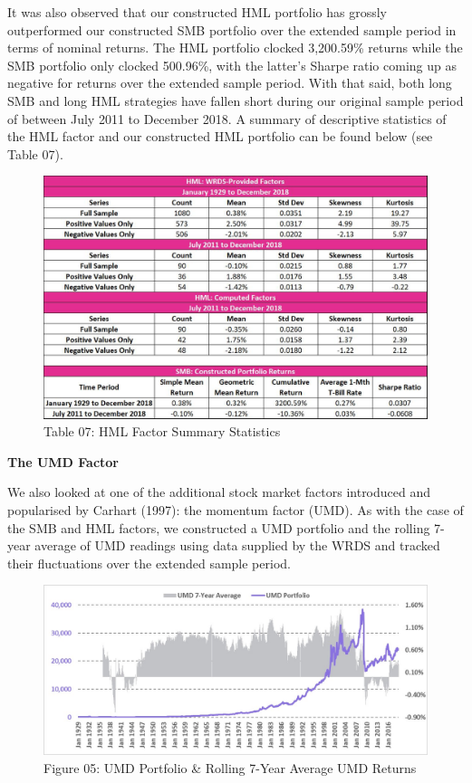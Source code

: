 \documentclass[12pt]{article}
\begin{document}
\noindent It was also observed that our constructed HML portfolio has grossly outperformed our constructed SMB portfolio over the extended sample period in terms of nominal returns. The HML portfolio clocked 3,200.59\% returns while the SMB portfolio only clocked 500.96\%, with the latter's Sharpe ratio coming up as negative for returns over the extended sample period. With that said, both long SMB and long HML strategies have fallen short during our original sample period of between July 2011 to December 2018. A summary of descriptive statistics of the HML factor and our constructed HML portfolio can be found below (see Table 07).

\begin{figure}[h]
	\centering
	\includegraphics[width=0.8\linewidth]{HML03}
	\caption*{Table 07: HML Factor Summary Statistics}
	\label{fig:label}
\end{figure}

\newpage

\noindent \textbf{The UMD Factor}

\noindent We also looked at one of the additional stock market factors introduced and popularised by Carhart (1997): the momentum factor (UMD). As with the case of the SMB and HML factors, we constructed a UMD portfolio and the rolling 7-year average of UMD readings using data supplied by the WRDS and tracked their fluctuations over the extended sample period.

\begin{figure}[h]
	\centering
	\includegraphics[width=0.9\linewidth]{UMD01}
	\caption*{Figure 05: UMD Portfolio \& Rolling 7-Year Average UMD Returns}
	\label{fig:label}
\end{figure}
\end{document}
